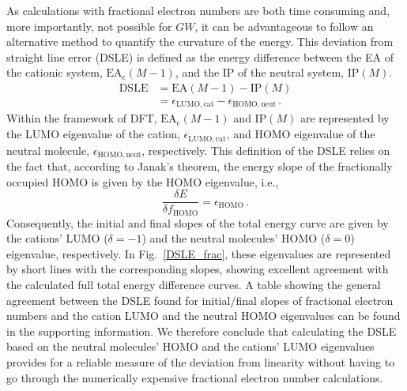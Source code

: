 \documentclass[journal=jctcce,manuscript=article,layout=twocolumn]{achemso}
\begin{document}
As calculations with fractional electron numbers are both time consuming and, more importantly, not possible for $GW$, 
it can be advantageous to follow an alternative method to quantify the curvature of the energy.\cite{PhysRevLett.103.176403,PhysRevB.81.205118,phys_rev_b_2016_dsle_tuning} 
This deviation from straight line error (DSLE) is defined as the energy difference between the EA of the cationic system, $\mathrm{EA_c}(M-1)$, and the IP of the neutral system, $\mathrm{IP}(M)$. 
\begin{equation} \label{eq:dsle_general}
\begin{split}
{\mathrm{DSLE}} &= \mathrm{EA}(M-1) - \mathrm{IP}(M) \\
    &= \epsilon_{\mathrm{LUMO,cat}} - \epsilon_{\mathrm{HOMO,neut}} \, .
\end{split}
\end{equation}
Within the framework of DFT,  $\mathrm{EA_c}(M-1)$ and $\mathrm{IP}(M)$ are represented by the LUMO eigenvalue of the cation, $\epsilon_{\mathrm{LUMO,cat}}$, and HOMO eigenvalue of the neutral molecule, $\epsilon_{\mathrm{HOMO,neut}}$, respectively. 
This definition of the DSLE relies on the fact that, according to Janak's theorem,\cite{Ja78} the energy slope of the fractionally occupied HOMO is given by the HOMO eigenvalue, i.e.,
\begin{equation} \label{eq:janak}
\frac{{\delta}E}{{\delta}f_{\mathrm{HOMO}}}={\epsilon}_{\mathrm{HOMO}}\, .
\end{equation}
Consequently,
the initial and final slopes of the total energy curve are given by the cations' LUMO ($\delta = -1$) and the neutral molecules' HOMO ($\delta = 0$) eigenvalue, respectively. In Fig.~\ref{DSLE_frac}, these eigenvalues are represented by short lines with the corresponding slopes, showing excellent agreement with the calculated full total energy difference curves.
A table showing the general agreement between the DSLE found for initial/final slopes of fractional electron numbers and the cation LUMO and the neutral HOMO eigenvalues can be found in the supporting information. 
We therefore conclude that calculating the DSLE based on the neutral molecules' HOMO and the cations' LUMO eigenvalues provides for a reliable measure of the deviation from linearity without having to go through the numerically expensive fractional electron number calculations.
\end{document}

